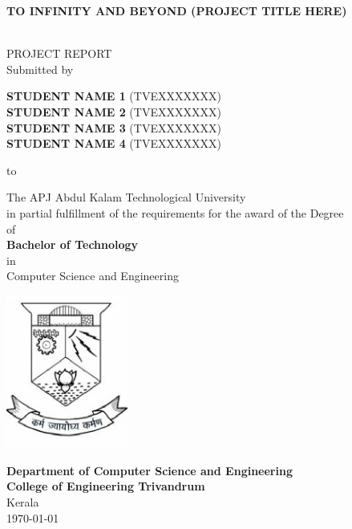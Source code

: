 \begin{titlepage}
\begin{center}
\begin{Large}{\textbf {TO INFINITY AND BEYOND (PROJECT TITLE HERE)}}\end{Large}\\[1.0cm]

 \textup{\large PROJECT REPORT}\\[1.0cm]

\textup{\large{Submitted by}}

\vfill

\begin{large} 
    \textbf {STUDENT NAME 1 } (TVEXXXXXXX) \\ 
    \textbf {STUDENT NAME 2 } (TVEXXXXXXX) \\ 
    \textbf {STUDENT NAME 3 } (TVEXXXXXXX) \\ 
    \textbf {STUDENT NAME 4 } (TVEXXXXXXX) \\ 

\end{large}

\vfill 

\textup{\large{to }}

\vfill


\textup{\normalsize {The APJ Abdul Kalam Technological University \\ in partial fulfillment of the requirements for the award of the Degree \\ of \\\textbf{ Bachelor of Technology} \\ in \\ \textit{}{Computer Science and Engineering}}}

\vfill

\includegraphics[width = 40mm]{cet_emblem.eps}

\vfill 


\textbf{Department of Computer Science and Engineering
}\\
\normalsize
\textbf{College of Engineering Trivandrum}\\
Kerala\\

\today

\vspace{0.5cm}

\end{center}

\end{titlepage}
\vspace{1.5in}
\linespread{}